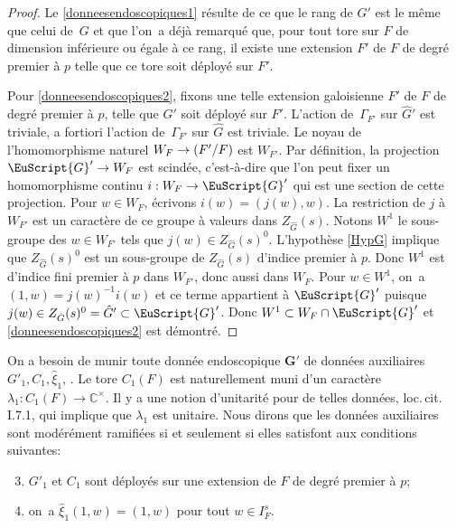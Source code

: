 \documentclass[JEP,XML,SOM,Unicode,francais]{cedram}
\let\mathcal \EuScript
\newcommand{\NoChangel}[1]{%
\expandafter\let\csname old\string#1\endcsname=#1
\let#1=\relax
\newcommand{#1}{\mathcode`l="716C\csname old\string#1\endcsname\mathcode`l="7160 }%
}
\DeclareMathOperator{\Gal}{Gal}\NoChangel{\Gal}
\newcommand{\bG}{\boldsymbol{G}}
\newcommand{\cG}{\mathcal{G}}
\newcommand{\CC}{\mathbb{C}}
\theoremstyle{plain}
\theoremstyle{definition}
\begin{document}
\begin{proof}
Le \eqref{donneesendoscopiques1} résulte de ce que le rang de $G'$ est le même que celui de~$G$ et que l'on~a déjà remarqué que, pour tout tore sur $F$ de dimension inférieure ou égale à ce rang, il existe une extension $F'$ de $F$ de degré premier à $p$ telle que ce tore soit déployé sur $F'$.

Pour \eqref{donneesendoscopiques2}, fixons une telle extension galoisienne $F'$ de $F$ de degré premier à $p$, telle que $G'$ soit déployé sur $F'$. L'action de~$\Gamma_{F'}$ sur $\hat{G}'$ est triviale, a fortiori l'action de~$\Gamma_{F'}$ sur $\hat{G}$ est triviale. Le noyau de l'homomorphisme naturel $W_{F}\to \Gal(F'/F)$ est $W_{F'}$.
Par définition, la projection $\cG'\to W_{F}$ est scindée, c'est-à-dire que l'on peut fixer un homomorphisme continu $i:W_{F}\to \cG'$ qui est une section de cette projection. Pour $w\in W_{F}$, écrivons $i(w)=(j(w),w)$. La restriction de $j$ à $W_{F'}$ est un caractère de ce groupe à valeurs dans $Z_{\hat{G}}(s)$. Notons $W^1$ le sous-groupe des $w\in W_{F'}$ tels que $j(w)\in Z_{\hat{G}}(s)^0$. L'hypothèse \ref{HypG} implique que $Z_{\hat{G}}(s)^0$ est un sous-groupe de $Z_{\hat{G}}(s)$ d'indice premier à $p$. Donc $W^1$ est d'indice fini premier à $p$ dans $W_{F'}$, donc aussi dans $W_{F}$. Pour $w\in W^1$, on~a $(1,w)=j(w)^{-1}i(w)$ et ce terme appartient à $ \cG'$ puisque $j(w)\in Z_{\hat{G}}(s)^0=\hat{G}'\subset \cG'$. Donc $W^1\subset W_{F}\cap \cG'$ et \eqref{donneesendoscopiques2} est démontré.
\end{proof}

On a besoin de munir toute donnée endoscopique $\bG'$ de données auxiliaires $G'_{1},C_{1},\hat{\xi}_{1}$, \cf \cite[I.2.1]{MW}. Le tore $C_{1}(F)$ est naturellement muni d'un caractère $\lambda_{1}:C_{1}(F)\to \CC^{\times}$. Il y a une notion d'unitarité pour de telles données, \cf loc.\,cit.\,I.7.1, qui implique que $\lambda_{1}$ est unitaire.
Nous dirons que les données auxiliaires sont modérément ramifiées si et seulement si elles satisfont aux conditions suivantes:
\begin{enumerate}\setcounter{enumi}{2}
\item\label{donneesendoscopiques3}
$G'_{1}$ et $C_{1}$ sont déployés sur une extension de $F$ de degré premier à $p$;

\item\label{donneesendoscopiques4}
on~a $\hat{\xi}_{1}(1,w)=(1,w)$ pour tout $w\in I_{F}^s$.
\end{enumerate}
\end{document}
